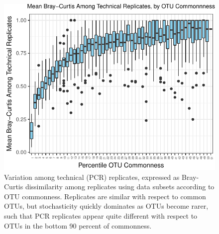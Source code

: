 \documentclass[fleqn,10pt,lineno]{wlpeerj} %
\begin{document}
\begin{figure}

{\centering \includegraphics{20171117_Tides_and_eDNA_RPK_files/figure-latex/stochastic_variation_rareTail-1} 

}

\caption{\label{fig:SuppFig2}Variation among technical (PCR) replicates, expressed as Bray-Curtis dissimilarity among replicates using data subsets according to OTU commonness. Replicates are similar with respect to common OTUs, but stochasticity quickly dominates as OTUs become rarer, such that PCR replicates appear quite different with respect to OTUs in the bottom 90 percent of commonness.}\label{fig:stochastic_variation_rareTail}
\end{figure}
\end{document}

